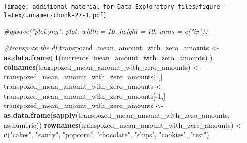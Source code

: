 \documentclass[
]{article}
\newenvironment{Shaded}{\begin{snugshade}}{\end{snugshade}}
\newcommand{\CommentTok}[1]{\textcolor[rgb]{0.56,0.35,0.01}{\textit{#1}}}
\newcommand{\DecValTok}[1]{\textcolor[rgb]{0.00,0.00,0.81}{#1}}
\newcommand{\FunctionTok}[1]{\textcolor[rgb]{0.13,0.29,0.53}{\textbf{#1}}}
\newcommand{\NormalTok}[1]{#1}
\newcommand{\OtherTok}[1]{\textcolor[rgb]{0.56,0.35,0.01}{#1}}
\newcommand{\SpecialCharTok}[1]{\textcolor[rgb]{0.81,0.36,0.00}{\textbf{#1}}}
\newcommand{\StringTok}[1]{\textcolor[rgb]{0.31,0.60,0.02}{#1}}
\begin{document}
\texttt{[image: additional\_material\_for\_Data\_Exploratory\_files/figure-latex/unnamed-chunk-27-1.pdf]}

\begin{Shaded}
\begin{Highlighting}[]
\CommentTok{\#ggsave("plot.png", plot, width = 10, height = 10, units = c("in"))}
\end{Highlighting}
\end{Shaded}

\begin{Shaded}
\begin{Highlighting}[]
\CommentTok{\#transpoze the df}
\NormalTok{transpozed\_mean\_amount\_with\_zero\_amounts }\OtherTok{\textless{}{-}} \FunctionTok{as.data.frame}\NormalTok{( }\FunctionTok{t}\NormalTok{(nutrients\_mean\_amount\_with\_zero\_amounts) )}
\FunctionTok{colnames}\NormalTok{(transpozed\_mean\_amount\_with\_zero\_amounts) }\OtherTok{\textless{}{-}}\NormalTok{ transpozed\_mean\_amount\_with\_zero\_amounts[}\DecValTok{1}\NormalTok{,]}
\NormalTok{transpozed\_mean\_amount\_with\_zero\_amounts }\OtherTok{\textless{}{-}}\NormalTok{ transpozed\_mean\_amount\_with\_zero\_amounts[}\SpecialCharTok{{-}}\DecValTok{1}\NormalTok{,]}
\NormalTok{transpozed\_mean\_amount\_with\_zero\_amounts }\OtherTok{\textless{}{-}} \FunctionTok{as.data.frame}\NormalTok{(}\FunctionTok{sapply}\NormalTok{(transpozed\_mean\_amount\_with\_zero\_amounts, as.numeric))}
\FunctionTok{rownames}\NormalTok{(transpozed\_mean\_amount\_with\_zero\_amounts) }\OtherTok{\textless{}{-}} \FunctionTok{c}\NormalTok{(}\StringTok{"cakes"}\NormalTok{, }\StringTok{"candy"}\NormalTok{, }\StringTok{"popcorn"}\NormalTok{, }\StringTok{"chocolate"}\NormalTok{, }\StringTok{"chips"}\NormalTok{, }\StringTok{"cookies"}\NormalTok{, }\StringTok{"test"}\NormalTok{)}
\end{Highlighting}
\end{Shaded}
\end{document}
